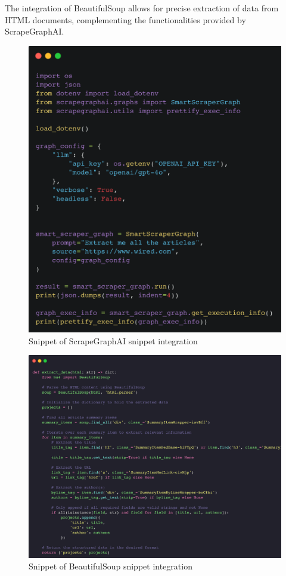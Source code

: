 The integration of BeautifulSoup allows for precise extraction of data from HTML documents, complementing the functionalities provided by ScrapeGraphAI.

\begin{figure}[h!]
    \centering
    \includegraphics[width=0.95\linewidth]{Assets/smart_scraper_wired.png}
    \caption{Snippet of ScrapeGraphAI snippet integration}
    \label{fig:smart_scraper_wired}
\end{figure}

\begin{figure}[h!]
    \centering
    \includegraphics[width=0.95\linewidth]{Assets/beautifousoup.png}
    \caption{Snippet of BeautifulSoup snippet integration}
    \label{fig:beautifousoup}
\end{figure}

